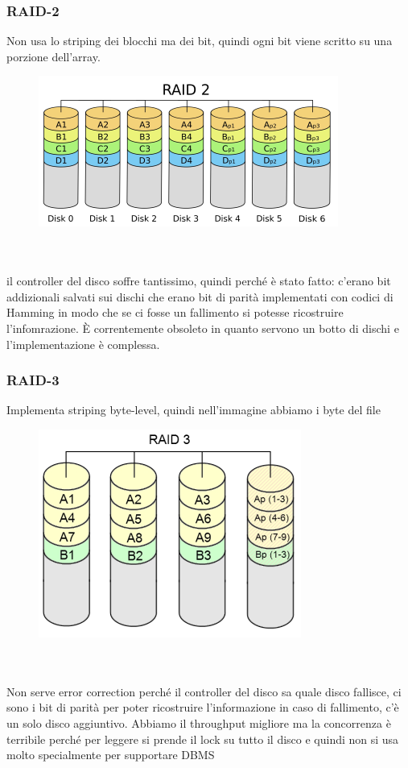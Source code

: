 \documentclass[12pt, oneside]{extbook} %
\begin{document}
\subsubsection{RAID-2}
Non usa lo striping dei blocchi ma dei bit, quindi ogni bit viene scritto su una porzione dell'array.\\
\begin{figure}[!h]
	\includegraphics[scale=0.4]{immagini/raid2.png}
\end{figure}\\\\
il controller del disco soffre tantissimo, quindi perché è stato fatto: c'erano bit addizionali salvati sui dischi che erano bit di parità implementati con codici di Hamming in modo che se ci fosse un fallimento si potesse ricostruire l'infomrazione. È correntemente obsoleto in quanto servono un botto di dischi e l'implementazione è complessa.
\subsubsection{RAID-3}
Implementa striping byte-level, quindi nell'immagine abbiamo i byte del file\\
\begin{figure}[!h]
	\includegraphics[scale=0.4]{immagini/raid3.png}
\end{figure}\\\\
Non serve error correction perché il controller del disco sa quale disco fallisce, ci sono i bit di parità per poter ricostruire l'informazione in caso di fallimento, c'è un solo disco aggiuntivo. Abbiamo il throughput migliore ma la concorrenza è terribile perché per leggere si prende il lock su tutto il disco e quindi non si usa molto specialmente per supportare DBMS
\end{document}
